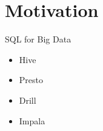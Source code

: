 \documentclass[newPxFont]{beamer}
\renewcommand{\event}[3][e]{%
  \pgfmathsetlength\xstop{(#2-\theyearstart)*\unit}%
  \ifx #1e%
    \draw[fill=black,draw=none,opacity=0.5]%
      (\xstop, 0) circle (.2\unit)%
      node[opacity=1,rotate=45,right=.2\unit] {#3};%
  \else%
    \pgfmathsetlength\xstart{(#1-\theyearstart)*\unit}%
    \draw[fill=black,draw=none,opacity=0.5,rounded corners=.1\unit]%
      (\xstart,-.1\unit) rectangle%
      node[opacity=1,rotate=45,right=.2\unit] {#3} (\xstop,.1\unit);%
  \fi}%
\begin{document}





%
%

\section*{Motivation}


\begin{frame}{SQL for Big Data}

\begin{itemize}
	\item Hive
	\item Presto
	\item Drill
	\item Impala
\end{itemize}

\end{frame}

\end{document}
